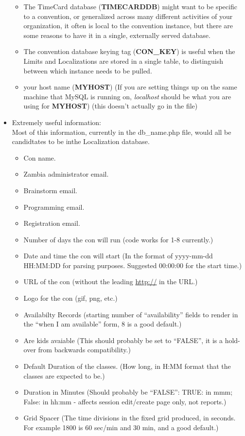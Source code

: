 \documentclass[tablesignature]{scrartcl}
\begin{document}
\begin{itemize}
\begin{itemize}
\item The TimeCard database (\textbf{TIMECARDDB}) might want to be specific to
     a convention, or generalized across many different activities of
     your organization, it often is local to the convention instance,
     but there are some reasons to have it in a single, externally
     served database.
\item The convention database keying tag (\textbf{CON\_{}KEY}) is useful when the
     Limits and Localizations are stored in a single table, to
     distinguish between which instance needs to be pulled.
\item your host name (\textbf{MYHOST}) (If you are setting things up on the same
     machine that MySQL is running on, \emph{localhost} should be what you
     are using for \textbf{MYHOST}) (this doesn't actually go in the file)
\end{itemize}


\item Extremely useful information:\\
\label{sec-1_2_4_2}%
Most of this information, currently in the db\_{}name.php file,
     would all be candidtates to be inthe Localization database.
\begin{itemize}
\item Con name.
\item Zambia administrator email.
\item Brainstorm email.
\item Programming email.
\item Registration email.
\item Number of days the con will run (code works for 1-8 currently.)
\item Date and time the con will start (In the format of yyyy-mm-dd
       HH:MM:DD for parsing purposes.  Suggested 00:00:00 for the
       start time.)
\item URL of the con (without the leading \href{http://}{http://} in the URL.)
\item Logo for the con (gif, png, etc.)
\item Availabilty Records (starting number of ``availability'' fields
       to render in the ``when I am available'' form, 8 is a good
       default.)
\item Are kids avaiable (This should probably be set to ``FALSE'', it
       is a hold-over from backwards compatibility.)
\item Default Duration of the classes. (How long, in H:MM format that
       the classes are expected to be.)
\item Duration in Minutes (Should probably be ``FALSE'': TRUE: in mmm;
       False: in hh:mm - affects session edit/create page only, not
       reports.)
\item Grid Spacer (The time divisions in the fixed grid produced, in
       seconds.  For example 1800 is 60 sec/min and 30 min, and a good
       default.)
\end{itemize}



\end{itemize}
\end{document}

